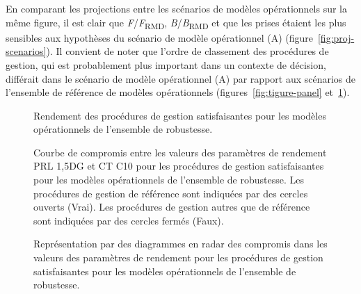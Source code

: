 \documentclass[11pt]{book}
\begin{document}
En comparant les projections entre les scénarios de modèles opérationnels sur la même figure, il est clair que \emph{F}/\emph{F}\textsubscript{RMD}, \emph{B}/\emph{B}\textsubscript{RMD} et que les prises étaient les plus sensibles aux hypothèses du scénario de modèle opérationnel (A) (figure~\ref{fig:proj-scenarios}). Il convient de noter que l'ordre de classement des procédures de gestion, qui est probablement plus important dans un contexte de décision, différait dans le scénario de modèle opérationnel (A) par rapport aux scénarios de l'ensemble de référence de modèles opérationnels (figures~\ref{fig:tigure-panel} et~\ref{fig:tigure-panel-rob}).


\begin{figure}[htb]

{\centering {} 

}

\caption{Rendement des procédures de gestion satisfaisantes pour les modèles opérationnels de l'ensemble de robustesse.}\label{fig:tigure-panel-rob}
\end{figure}
\begin{figure}[htb]

{\centering {} 

}

\caption{Courbe de compromis entre les valeurs des paramètres de rendement PRL 1,5DG et CT C10 pour les procédures de gestion satisfaisantes pour les modèles opérationnels de l’ensemble de robustesse. Les procédures de gestion de référence sont indiquées par des cercles ouverts (Vrai). Les procédures de gestion autres que de référence sont indiquées par des cercles fermés (Faux).}\label{fig:tradeoff-robust}
\end{figure}
\begin{figure}[htb]

{\centering {} 

}

\caption{Représentation par des diagrammes en radar des compromis dans les valeurs des paramètres de rendement pour les procédures de gestion satisfaisantes pour les modèles opérationnels de l’ensemble de robustesse.}\label{fig:spider-satisficed-mps-robust}
\end{figure}
\end{document}
